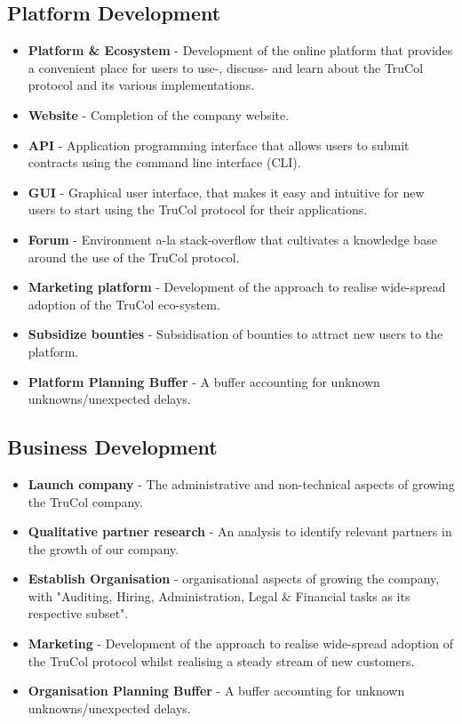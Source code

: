 \subsection{Platform Development}
\begin{itemize}
	\item \textbf{Platform \& Ecosystem} - Development of the online platform that provides a convenient place for users to use-, discuss- and learn about the TruCol protocol and its various implementations.
	\item \textbf{Website} - Completion of the company website.
	\item \textbf{API} - Application programming interface that allows users to submit contracts using the command line interface (CLI). 
	\item \textbf{GUI} - Graphical user interface, that makes it easy and intuitive for new users to start using the TruCol protocol for their applications.
	\item \textbf{Forum} - Environment a-la stack-overflow that cultivates a knowledge base around the use of the TruCol protocol.
	\item \textbf{Marketing platform} - Development of the approach to realise wide-spread adoption of the TruCol eco-system.
	\item \textbf{Subsidize bounties} - Subsidisation of bounties to attract new users to the platform.
	\item \textbf{Platform Planning Buffer} -  A buffer accounting for unknown unknowns/unexpected delays.
\end{itemize}

\subsection{Business Development}
\begin{itemize}
	\item \textbf{Launch company} -  The administrative and non-technical aspects of growing the TruCol company.
	\item \textbf{Qualitative partner research} - An analysis to identify relevant partners in the growth of our company.
	\item \textbf{Establish Organisation} - organisational aspects of growing the company, with "Auditing, Hiring, Administration, Legal \& Financial tasks as its respective subset".
	\item \textbf{Marketing} - Development of the approach to realise wide-spread adoption of the TruCol protocol whilst realising a steady stream of new customers.
	\item \textbf{Organisation Planning Buffer} -  A buffer accounting for unknown unknowns/unexpected delays.
\end{itemize}

